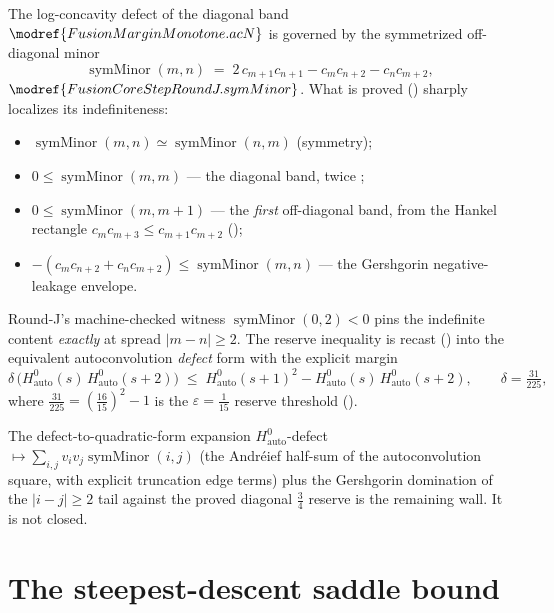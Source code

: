 The log-concavity defect of the diagonal band $\modref{FusionMarginMonotone.acN}$ is
governed by the symmetrized off-diagonal minor
\[
  \operatorname{symMinor}(m,n) \;=\; 2\,c_{m+1}c_{n+1} - c_m c_{n+2} - c_n c_{m+2},
\]
$\modref{FusionCoreStepRoundJ.symMinor}$.  What is proved
() sharply localizes its indefiniteness:
\begin{itemize}
\item $\operatorname{symMinor}(m,n)\simeq\operatorname{symMinor}(n,m)$ (symmetry);
\item $0\le\operatorname{symMinor}(m,m)$ — the diagonal band, twice
  ;
\item $0\le\operatorname{symMinor}(m,m+1)$ — the \emph{first} off-diagonal band,
  from the Hankel rectangle $c_m c_{m+3}\le c_{m+1}c_{m+2}$
  ();
\item $-(c_m c_{n+2}+c_n c_{m+2})\le\operatorname{symMinor}(m,n)$ — the Gershgorin
  negative-leakage envelope.
\end{itemize}
Round-J's machine-checked witness $\operatorname{symMinor}(0,2)<0$ pins the
indefinite content \emph{exactly} at spread $|m-n|\ge 2$.  The reserve inequality is
recast () into the equivalent
autoconvolution \emph{defect} form with the explicit margin
\[
  \delta\,\bigl(H^0_{\mathrm{auto}}(s)\,H^0_{\mathrm{auto}}(s+2)\bigr)
    \;\le\; H^0_{\mathrm{auto}}(s+1)^{2}
      - H^0_{\mathrm{auto}}(s)\,H^0_{\mathrm{auto}}(s+2),
  \qquad \delta = \tfrac{31}{225},
\]
where $\tfrac{31}{225} = (\tfrac{16}{15})^{2}-1$ is the $\varepsilon=\tfrac1{15}$
reserve threshold ().

\begin{remark}
The defect-to-quadratic-form expansion
$H^0_{\mathrm{auto}}$-defect $\mapsto \sum_{i,j} v_i v_j\operatorname{symMinor}(i,j)$
(the Andréief half-sum of the autoconvolution square, with explicit truncation edge
terms) plus the Gershgorin domination of the $|i-j|\ge 2$ tail against the proved
diagonal $\tfrac34$ reserve is the remaining wall.  It is not closed.
\end{remark}

\section{The steepest-descent saddle bound}
\label{sec:core-b-saddle}

